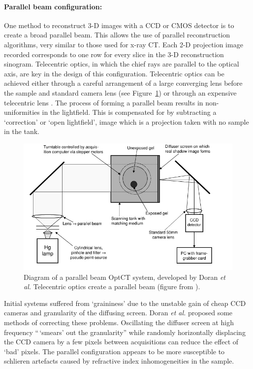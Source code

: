 \documentclass[12pt]{article}
\begin{document}
\paragraph{Parallel beam configuration:} One method to reconstruct 3-D images with a CCD or CMOS detector is to create a broad parallel beam. This allows the use of parallel reconstruction algorithms, very similar to those used for x-ray CT. Each 2-D projection image recorded corresponds to one row for every slice in the 3-D reconstruction sinogram. \cite{Doran:2008kh}
Telecentric optics, in which the chief rays are parallel to the optical axis, are key in the design of this configuration. \cite{Walls:2005ja} Telecentric optics can be achieved either through a careful arrangement  of  a large converging lens before the sample and standard camera lens  \cite{Doran:2001ee} (see Figure~\ref{fig:doran_ccd_setup}) or through an expensive telecentric lens \cite{Sakhalkar:2008exa}. The process of forming a parallel beam results in non-uniformities in the lightfield. This is compensated for by subtracting a `correction' or `open lightfield', image which is a projection taken with no sample in the tank. \cite{Doran:2001ee}


\begin{figure}[H]
\centering
\includegraphics[scale=0.6]{Doran_2001_ccdsetup.jpg}
\caption{Diagram of a parallel beam  OptCT system, developed by Doran \textit{et al.} Telecentric optics create a parallel beam  (figure from \cite{Doran:2001ee}). }
\label{fig:doran_ccd_setup}
\end{figure}



Initial systems  suffered from `graininess' due to the unstable gain of cheap CCD cameras and granularity of the diffusing screen. \cite{Doran:2001ee}   Doran \textit{et al.} proposed some methods of correcting these problems. Oscillating the diffuser screen at high frequency 
``\,`smears' out the granularity'' while randomly horizontally displacing the CCD camera by a few pixels  between acquisitions can reduce the effect of `bad'  pixels.
 \cite{Doran:2001ee}
 The parallel configuration appears to be more susceptible to schlieren artefacts caused by refractive index inhomogeneities in the sample. \cite{Krstajic:2007hk}
\end{document}
